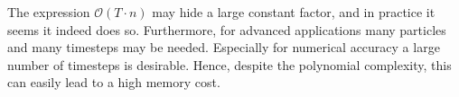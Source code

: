 The expression $\mathcal{O}(T \cdot n)$ may hide a large constant factor, and in practice it seems it indeed does so. Furthermore, for advanced applications many particles and many timesteps may be needed. Especially for numerical accuracy a large number of timesteps is desirable. Hence, despite the polynomial complexity, this can easily lead to a high memory cost.